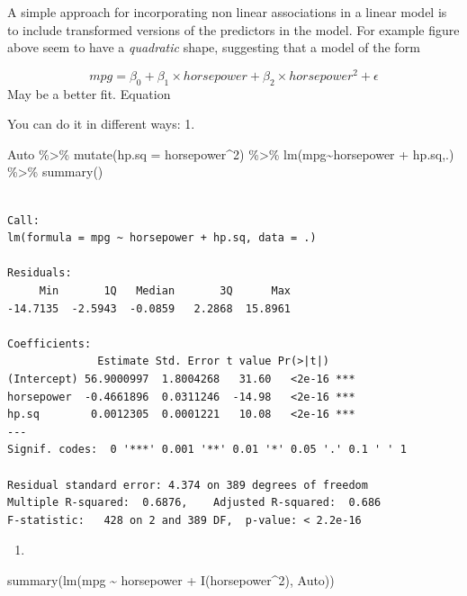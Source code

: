 \documentclass[
  letterpaper,
  DIV=11,
  numbers=noendperiod]{scrreprt}
\newenvironment{Shaded}{\begin{snugshade}}{\end{snugshade}}
\newcommand{\AttributeTok}[1]{\textcolor[rgb]{0.65,0.35,0.00}{#1}}
\newcommand{\DecValTok}[1]{\textcolor[rgb]{0.47,0.16,0.63}{#1}}
\newcommand{\FunctionTok}[1]{\textcolor[rgb]{0.02,0.16,0.49}{#1}}
\newcommand{\NormalTok}[1]{\textcolor[rgb]{0.33,0.33,0.33}{#1}}
\newcommand{\SpecialCharTok}[1]{\textcolor[rgb]{0.00,0.46,0.62}{#1}}
\providecommand{\tightlist}{%
  \setlength{\itemsep}{0pt}\setlength{\parskip}{0pt}}\usepackage{longtable,booktabs,array}
\begin{document}
A simple approach for incorporating non linear associations in a linear
model is to include transformed versions of the predictors in the model.
For example figure above seem to have a \emph{quadratic} shape,
suggesting that a model of the form

\[
mpg = \beta_0 + \beta_1 \times horsepower + \beta_2 \times horsepower^2 + \epsilon
\] May be a better fit. Equation

You can do it in different ways: 1.

\begin{Shaded}
\begin{Highlighting}[]
\NormalTok{Auto }\SpecialCharTok{\%\textgreater{}\%} 
  \FunctionTok{mutate}\NormalTok{(}\AttributeTok{hp.sq =}\NormalTok{ horsepower}\SpecialCharTok{\^{}}\DecValTok{2}\NormalTok{) }\SpecialCharTok{\%\textgreater{}\%} 
  \FunctionTok{lm}\NormalTok{(mpg}\SpecialCharTok{\textasciitilde{}}\NormalTok{horsepower }\SpecialCharTok{+}\NormalTok{ hp.sq,.) }\SpecialCharTok{\%\textgreater{}\%} 
  \FunctionTok{summary}\NormalTok{()}
\end{Highlighting}
\end{Shaded}

\begin{verbatim}

Call:
lm(formula = mpg ~ horsepower + hp.sq, data = .)

Residuals:
     Min       1Q   Median       3Q      Max 
-14.7135  -2.5943  -0.0859   2.2868  15.8961 

Coefficients:
              Estimate Std. Error t value Pr(>|t|)    
(Intercept) 56.9000997  1.8004268   31.60   <2e-16 ***
horsepower  -0.4661896  0.0311246  -14.98   <2e-16 ***
hp.sq        0.0012305  0.0001221   10.08   <2e-16 ***
---
Signif. codes:  0 '***' 0.001 '**' 0.01 '*' 0.05 '.' 0.1 ' ' 1

Residual standard error: 4.374 on 389 degrees of freedom
Multiple R-squared:  0.6876,    Adjusted R-squared:  0.686 
F-statistic:   428 on 2 and 389 DF,  p-value: < 2.2e-16
\end{verbatim}

\begin{enumerate}
\def\labelenumi{\arabic{enumi}.}
\setcounter{enumi}{1}
\tightlist
\item
\end{enumerate}

\begin{Shaded}
\begin{Highlighting}[]
\FunctionTok{summary}\NormalTok{(}\FunctionTok{lm}\NormalTok{(mpg }\SpecialCharTok{\textasciitilde{}}\NormalTok{ horsepower }\SpecialCharTok{+} \FunctionTok{I}\NormalTok{(horsepower}\SpecialCharTok{\^{}}\DecValTok{2}\NormalTok{), Auto))}
\end{Highlighting}
\end{Shaded}
\end{document}
